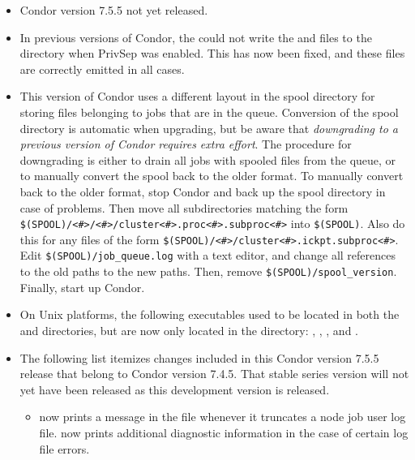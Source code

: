\begin{itemize}

\item Condor version 7.5.5 not yet released.

\item In previous versions of Condor, the  could not 
write the  and  files to the 
directory when PrivSep was enabled.  This has now been fixed, and these files
are correctly emitted in all cases.

\item This version of Condor uses a different layout in the spool
  directory for storing files belonging to jobs that are in the queue.
  Conversion of the spool directory is automatic when upgrading, but
  be aware that \emph{downgrading to a previous version of Condor
  requires extra effort}.  The procedure for downgrading is either
  to drain all jobs with spooled files from the queue, or to manually
  convert the spool back to the older format.  To manually convert
  back to the older format, stop Condor and back up the spool directory
  in case of problems.  Then move all subdirectories matching the form
  \verb|$(SPOOL)/<#>/<#>/cluster<#>.proc<#>.subproc<#>| into
  \verb|$(SPOOL)|.  Also do this for any files of the form
  \verb|$(SPOOL)/<#>/cluster<#>.ickpt.subproc<#>|.  Edit
  \verb|$(SPOOL)/job_queue.log| with a text editor, and change all
  references to the old paths to the new paths.  Then, remove
  \verb|$(SPOOL)/spool_version|.  Finally, start up Condor.

\item On Unix platforms, the following executables used to be located in both
  the  and  directories,
  but are now only located in the 
  directory: , , , and
  .

\item The following list itemizes changes included in this Condor version
  7.5.5 release that belong to Condor version 7.4.5.  That stable series
  version will not yet have been released as this development version 
  is released.
  \begin{itemize}

  \item {} now prints a message in the  file
  whenever it truncates a node job user log file.
   now prints additional diagnostic information in the
  case of certain log file errors.


\end{itemize}
\end{itemize}
